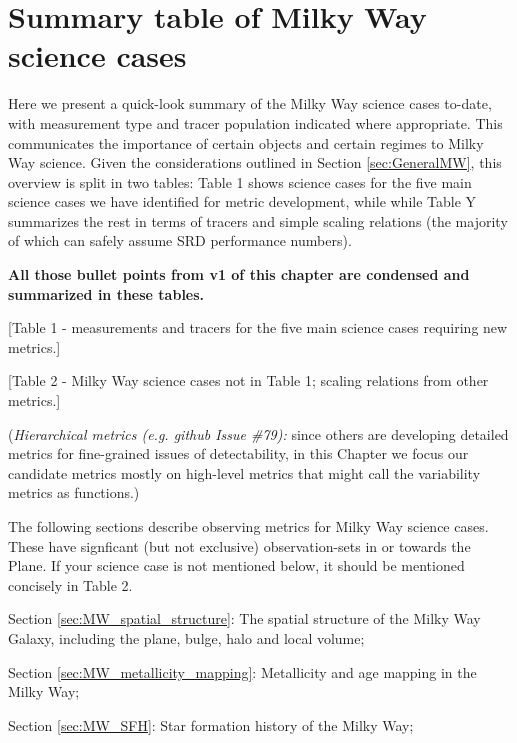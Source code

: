\section{Summary table of Milky Way science cases}
\def\secname{SummaryTableMW}\label{sec:\secname}

Here we present a quick-look summary of the Milky Way science cases
to-date, with measurement type and tracer population indicated where
appropriate. This communicates the importance of certain objects and
certain regimes to Milky Way science. Given the considerations
outlined in Section \ref{sec:GeneralMW}, this overview is split in two
tables: Table 1 shows science cases for the five main science cases we
have identified for metric development, while while Table Y summarizes
the rest in terms of tracers and simple scaling relations (the
majority of which can safely assume SRD performance numbers).

{\bf All those bullet points from v1 of this chapter are condensed and summarized in these tables.}

[Table 1 - measurements and tracers for the five main science cases requiring new metrics.]

[Table 2 - Milky Way science cases not in Table 1; scaling relations from other metrics.]

({\it Hierarchical metrics (e.g. github Issue \#79):} since others are
developing detailed metrics for fine-grained issues of detectability,
in this Chapter we focus our candidate metrics mostly on high-level
metrics that might call the variability metrics as functions.)

The following sections describe observing metrics for Milky Way
science cases. These have signficant (but not exclusive)
observation-sets in or towards the Plane. If your science case is not
mentioned below, it should be mentioned concisely in Table 2.



Section \ref{sec:MW_spatial_structure}: The spatial structure of the Milky Way Galaxy, including the plane, bulge, halo and local volume;

Section \ref{sec:MW_metallicity_mapping}: Metallicity and age mapping in the Milky Way;

Section \ref{sec:MW_SFH}: Star formation history of the Milky Way;

